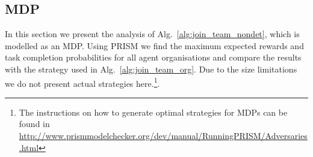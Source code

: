 \documentclass{llncs}
\begin{document}
\subsection{MDP}
\label{subsec:MDP}

In this section we present the analysis of Alg.~\ref{alg:join_team_nondet}, %
which is modelled as an MDP. Using PRISM we find the maximum expected rewards and task completion probabilities for all agent organisations and compare the results with the strategy used in Alg.~\ref{alg:join_team_org}. Due to the size limitations we do not present actual strategies here.\footnote{The instructions on how to generate optimal strategies for MDPs can be found in \url{http://www.prismmodelchecker.org/dev/manual/RunningPRISM/Adversaries.html}}.


\begin{table}
\centering
{}
\caption{Maximum task completion probabilities for optimal agent organisations using Alg.~\ref{alg:join_team_nondet}'s online and offline versions (see Alg.~\ref{alg:main_process}).}
\label{tab:mdp_probs}
\end{table}
\end{document}
